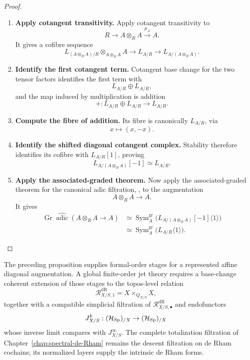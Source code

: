 \begin{proof}
\leavevmode
\begin{enumerate}[label=\textup{(\arabic*)}]
    \item \textbf{Apply cotangent transitivity.}
Apply cotangent transitivity
\cite{LurieHigherAlgebra,LurieSAG} to
\[
  R\longrightarrow A\otimes_RA\xrightarrow{\mu_A}A.
\]
It gives a cofibre sequence
\[
  L_{(A\otimes_RA)/R}\otimes_{A\otimes_RA}A
  \longrightarrow
  L_{A/R}
  \longrightarrow
  L_{A/(A\otimes_RA)}.
\]

    \item \textbf{Identify the first cotangent term.}
Cotangent base change for the two tensor factors identifies the first term with
\[
  L_{A/R}\oplus L_{A/R},
\]
and the map induced by multiplication is addition
\[
  +:L_{A/R}\oplus L_{A/R}\longrightarrow L_{A/R}.
\]

    \item \textbf{Compute the fibre of addition.}
Its fibre is canonically \(L_{A/R}\), via
\[
  x\longmapsto(x,-x).
\]

    \item \textbf{Identify the shifted diagonal cotangent complex.}
Stability therefore identifies its cofibre with \(L_{A/R}[1]\), proving
\[
  L_{A/(A\otimes_RA)}[-1]
  \simeq
  L_{A/R}.
\]

    \item \textbf{Apply the associated-graded theorem.}
Now apply the associated-graded theorem for the canonical adic filtration,
, to the augmentation
\[
  A\otimes_RA\to A.
\]
It gives
\[
\begin{aligned}
  \operatorname{Gr}
  \widehat{\operatorname{adic}}(A\otimes_RA\to A)
  &\simeq
  \operatorname{Sym}^{\mathrm{gr}}_A
  \bigl(
    L_{A/(A\otimes_RA)}[-1]\langle1\rangle
  \bigr)\\
  &\simeq
  \operatorname{Sym}^{\mathrm{gr}}_A
  \bigl(L_{A/R}\langle1\rangle\bigr).
\end{aligned}
\]
\end{enumerate}
\end{proof}

\begin{remark}
The preceding proposition supplies formal-order stages for a represented
affine diagonal augmentation. A global finite-order jet theory requires a
base-change coherent extension of those stages to the topos-level relation
\[
  \mathcal R^{\mathrm{dR}}_{X/S,1}
  =
  X\times_{Q_{X/S}}X,
\]
together with a compatible simplicial filtration of
\(\mathcal R^{\mathrm{dR}}_{X/S,\bullet}\) and endofunctors
\[
  J^k_{X/S}:(\mathcal H_{\operatorname{Sp}})_{/X}\to(\mathcal H_{\operatorname{Sp}})_{/X}
\]
whose inverse limit compares with \(J^\infty_{X/S}\).
The complete totalization filtration of
Chapter~\ref{chap:spectral-de-Rham} remains the descent filtration on
de Rham cochains; its normalized layers supply the intrinsic de Rham forms.
\end{remark}

